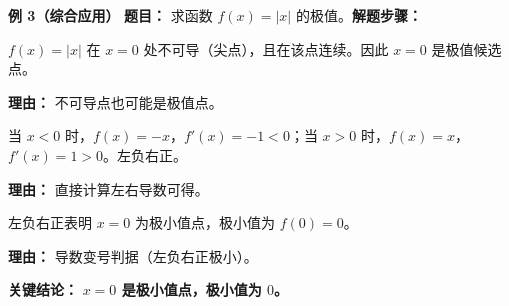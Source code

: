 \begin{examplebox}
	\medskip
	\textbf{\textcolor{CExample}{例 3（综合应用）}}
	\textbf{\textcolor{CExample}{题目：}} 求函数 $f(x)=|x|$ 的极值。\textbf{\textcolor{CExample}{解题步骤：}}
	\begin{description}[style=nextline, leftmargin=2.8em, labelsep=0.5em, itemsep=0.45em]
		\item[\textbf{第一步（确定候选点）：}]
			$f(x)=|x|$ 在 $x=0$ 处不可导（尖点），且在该点连续。因此 $x=0$ 是极值候选点。
			\par\textbf{理由：} 不可导点也可能是极值点。
		\item[\textbf{第二步（左右导数符号）：}]
			当 $x<0$ 时，$f(x)=-x$，$f'(x)=-1<0$；当 $x>0$ 时，$f(x)=x$，$f'(x)=1>0$。左负右正。
			\par\textbf{理由：} 直接计算左右导数可得。
		\item[\textbf{第三步（极值判定）：}]
			左负右正表明 $x=0$ 为极小值点，极小值为 $f(0)=0$。
			\par\textbf{理由：} 导数变号判据（左负右正极小）。
	\end{description}
	\textbf{\textcolor{CExample}{关键结论：}}
	\textbf{$x=0$ 是极小值点，极小值为 $0$。}
\end{examplebox}
